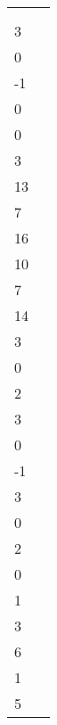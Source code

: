 \begin{applicationActivities}
\begin{activity}{15}
\begin{tabular}{ll}
 & \\
     \(\vspan\left\{
    \begin{bmatrix}2\\3\\0\\-1\end{bmatrix},
    \begin{bmatrix}2\\0\\0\\3\end{bmatrix},
    \begin{bmatrix}3\\13\\7\\16\end{bmatrix},
    \begin{bmatrix}-1\\10\\7\\14\end{bmatrix},
    \begin{bmatrix}4\\3\\0\\2\end{bmatrix}
    \right\}
    \)
 &
     \(\vspan\left\{
    \begin{bmatrix}2\\3\\0\\-1\end{bmatrix},
    \begin{bmatrix}4\\3\\0\\2\end{bmatrix},
    \begin{bmatrix}-3\\0\\1\\3\end{bmatrix},
    \begin{bmatrix}3\\6\\1\\5\end{bmatrix}
    \right\}
    \) \\


\end{tabular}
\end{activity}
\end{applicationActivities}
